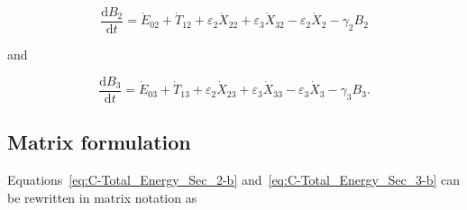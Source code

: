 \begin{equation} \label{eq:C-Total_Energy_Sec_2-b}
	\frac{\mathrm{d}B_{2}}{\mathrm{d}t}
	= \dot{E}_{02}
	+ \dot{T}_{12}
	+ \varepsilon_{2} \dot{X}_{22}
	+ \varepsilon_{3} \dot{X}_{32}
	- \varepsilon_{2} \dot{X}_{2}
	- \gamma_{2} B_{2}
\end{equation}

\noindent{}and

\begin{equation} \label{eq:C-Total_Energy_Sec_3-b}
	\frac{\mathrm{d}B_{3}}{\mathrm{d}t}
	= \dot{E}_{03}
	+ \dot{T}_{13}
	+ \varepsilon_{2} \dot{X}_{23}
	+ \varepsilon_{3} \dot{X}_{33}
	- \varepsilon_{3} \dot{X}_{3}
	- \gamma_{3} B_{3}.
\end{equation}


\subsection{Matrix formulation} %
\label{sec:C-matrix}

\noindent{}Equations~\ref{eq:C-Total_Energy_Sec_2-b} 
and~\ref{eq:C-Total_Energy_Sec_3-b} can be rewritten 
in matrix notation as

